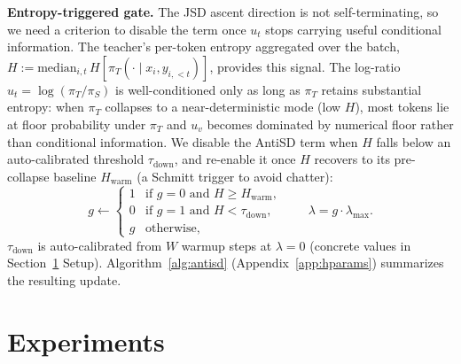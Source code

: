 \documentclass{article}
\begin{document}
\textbf{Entropy-triggered gate.} The JSD ascent direction is not self-terminating, so we need a criterion to disable the term once $u_t$ stops carrying useful conditional information. The teacher's per-token entropy aggregated over the batch, $H := \mathrm{median}_{i,t}\, H[\pi_T(\cdot \mid x_i, y_{i,<t})]$, provides this signal. The log-ratio $u_t = \log(\pi_T/\pi_S)$ is well-conditioned only as long as $\pi_T$ retains substantial entropy: when $\pi_T$ collapses to a near-deterministic mode (low $H$), most tokens lie at floor probability under $\pi_T$ and $u_v$ becomes dominated by numerical floor rather than conditional information. We disable the AntiSD term when $H$ falls below an auto-calibrated threshold $\tau_{\mathrm{down}}$, and re-enable it once $H$ recovers to its pre-collapse baseline $H_{\mathrm{warm}}$ (a Schmitt trigger to avoid chatter):
\begin{equation}
  g \leftarrow
  \begin{cases}
    1 & \text{if } g=0 \text{ and } H \ge H_{\mathrm{warm}},  \\
    0 & \text{if } g=1 \text{ and } H < \tau_{\mathrm{down}}, \\
    g & \text{otherwise,}
  \end{cases}
  \qquad \lambda = g \cdot \lambda_{\max}.
\end{equation}
$\tau_{\mathrm{down}}$ is auto-calibrated from $W$ warmup steps at $\lambda=0$ (concrete values in Section~\ref{sec:exp} Setup). Algorithm~\ref{alg:antisd} (Appendix~\ref{app:hparams}) summarizes the resulting update.

\section{Experiments}
\label{sec:exp}
\vspace{-0.5em}

\end{document}
